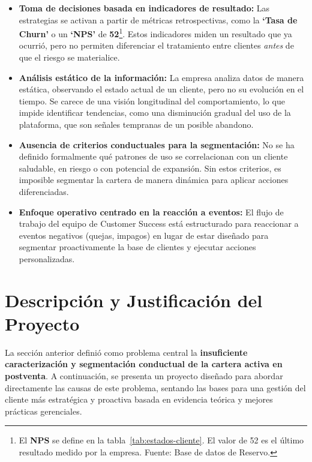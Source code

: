 \begin{itemize}
    \item \textbf{Toma de decisiones basada en indicadores de resultado:} Las estrategias se activan a partir de métricas retrospectivas, como la \textbf{`Tasa de Churn'} o un \textbf{`NPS'} de \textbf{52}\footnote{El \textbf{NPS} se define en la tabla~\ref{tab:estados-cliente}. El valor de 52 es el último resultado medido por la empresa. Fuente: Base de datos de Reservo.}. Estos indicadores miden un resultado que ya ocurrió, pero no permiten diferenciar el tratamiento entre clientes \textit{antes} de que el riesgo se materialice.

    \item \textbf{Análisis estático de la información:} La empresa analiza datos de manera estática, observando el estado actual de un cliente, pero no su evolución en el tiempo. Se carece de una visión longitudinal del comportamiento, lo que impide identificar tendencias, como una disminución gradual del uso de la plataforma, que son señales tempranas de un posible abandono.

    \item \textbf{Ausencia de criterios conductuales para la segmentación:} No se ha definido formalmente qué patrones de uso se correlacionan con un cliente saludable, en riesgo o con potencial de expansión. Sin estos criterios, es imposible segmentar la cartera de manera dinámica para aplicar acciones diferenciadas.

    \item \textbf{Enfoque operativo centrado en la reacción a eventos:} El flujo de trabajo del equipo de Customer Success está estructurado para reaccionar a eventos negativos (quejas, impagos) en lugar de estar diseñado para segmentar proactivamente la base de clientes y ejecutar acciones personalizadas.
\end{itemize}

\section{Descripción y Justificación del Proyecto}

La sección anterior definió como problema central la \textbf{insuficiente caracterización y segmentación conductual de la cartera activa en postventa}. A continuación, se presenta un proyecto diseñado para abordar directamente las causas de este problema, sentando las bases para una gestión del cliente más estratégica y proactiva basada en evidencia teórica y mejores prácticas gerenciales.

